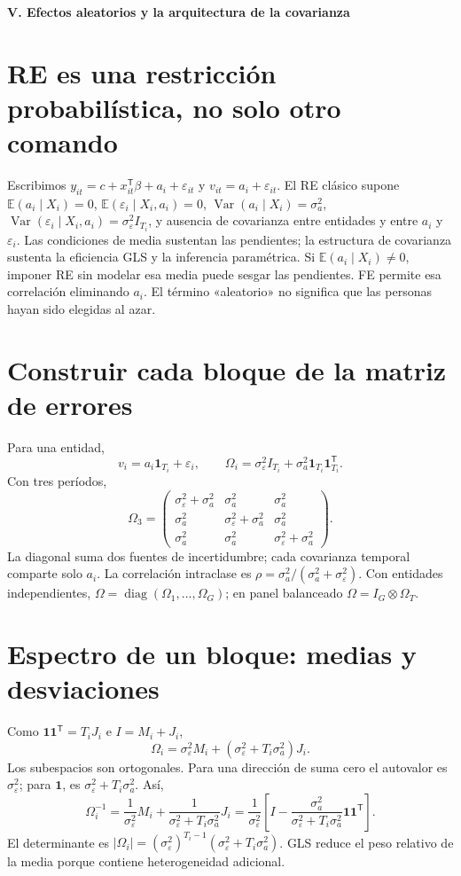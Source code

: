 \documentclass[11pt,a4paper]{article}
\newcommand{\E}{\mathbb E}
\newcommand{\T}{^{\mathsf T}}
\DeclareMathOperator{\Var}{Var}
\DeclareMathOperator{\diag}{diag}
\newcommand{\ones}{\mathbf 1}
\theoremstyle{definition}
\newcommand{\parte}[1]{\par\bigskip\Needspace{8\baselineskip}\begin{center}{\Large\bfseries\color{azul}#1}\end{center}}
\newcommand{\eps}{\varepsilon}
\begin{document}
\parte{V. Efectos aleatorios y la arquitectura de la covarianza}
\section{RE es una restricción probabilística, no solo otro comando}
Escribimos $y_{it}=c+x_{it}\T\beta+a_i+\eps_{it}$ y $v_{it}=a_i+\eps_{it}$.
El RE clásico supone $\E(a_i\mid X_i)=0$, $\E(\eps_i\mid X_i,a_i)=0$,
$\Var(a_i\mid X_i)=\sigma_a^2$, $\Var(\eps_i\mid X_i,a_i)=\sigma_\eps^2I_{T_i}$,
y ausencia de covarianza entre entidades y entre $a_i$ y $\eps_i$.
Las condiciones de media sustentan las pendientes; la estructura de covarianza sustenta la eficiencia GLS y la inferencia paramétrica. Si $\E(a_i\mid X_i)\ne0$, imponer RE sin modelar esa media puede sesgar las pendientes. FE permite esa correlación eliminando $a_i$. El término «aleatorio» no significa que las personas hayan sido elegidas al azar.

\section{Construir cada bloque de la matriz de errores}
Para una entidad,
\[
v_i=a_i\ones_{T_i}+\eps_i,\qquad
\Omega_i=\sigma_\eps^2 I_{T_i}+\sigma_a^2\ones_{T_i}\ones_{T_i}\T.
\]
Con tres períodos,
\[
\Omega_3=\begin{pmatrix}
\sigma_\eps^2+\sigma_a^2&\sigma_a^2&\sigma_a^2\\
\sigma_a^2&\sigma_\eps^2+\sigma_a^2&\sigma_a^2\\
\sigma_a^2&\sigma_a^2&\sigma_\eps^2+\sigma_a^2
\end{pmatrix}.
\]
La diagonal suma dos fuentes de incertidumbre; cada covarianza temporal comparte solo $a_i$. La correlación intraclase es
$\rho=\sigma_a^2/(\sigma_a^2+\sigma_\eps^2)$.
Con entidades independientes, $\Omega=\diag(\Omega_1,\ldots,\Omega_G)$; en panel balanceado $\Omega=I_G\otimes\Omega_T$.

\section{Espectro de un bloque: medias y desviaciones}
Como $\ones\ones\T=T_iJ_i$ e $I=M_i+J_i$,
\[
\Omega_i=\sigma_\eps^2M_i+(\sigma_\eps^2+T_i\sigma_a^2)J_i.
\]
Los subespacios son ortogonales. Para una dirección de suma cero el autovalor es $\sigma_\eps^2$; para $\ones$, es $\sigma_\eps^2+T_i\sigma_a^2$. Así,
\[
\Omega_i^{-1}
=\frac1{\sigma_\eps^2}M_i+
\frac1{\sigma_\eps^2+T_i\sigma_a^2}J_i
=\frac1{\sigma_\eps^2}\left[
I-\frac{\sigma_a^2}{\sigma_\eps^2+T_i\sigma_a^2}\ones\ones\T\right].
\]
El determinante es
$|\Omega_i|=(\sigma_\eps^2)^{T_i-1}(\sigma_\eps^2+T_i\sigma_a^2)$.
GLS reduce el peso relativo de la media porque contiene heterogeneidad adicional.
\end{document}
